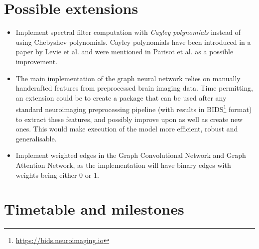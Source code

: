 \documentclass[12pt,a4paper,twoside]{article}
\begin{document}
\section*{Possible extensions}
\begin{itemize}
  \item Implement spectral filter computation with \textit{Cayley polynomials} instead of using Chebyshev polynomials. Cayley polynomials have been introduced in a paper by Levie et al. \cite{levie2017cayleynets} and were mentioned in Parisot et al. \cite{parisot2018disease} as a possible improvement.
  \item The main implementation of the graph neural network relies on manually handcrafted features from preprocessed brain imaging data. Time permitting, an extension could be to create a package that can be used after any standard neuroimaging preprocessing pipeline (with results in BIDS\footnote{\url{https://bids.neuroimaging.io}} format) to extract these features, and possibly improve upon as well as create new ones. This would make execution of the model more efficient, robust and generalisable.
  \item Implement weighted edges in the Graph Convolutional Network and Graph Attention Network, as the implementation will have binary edges with weights being either 0 or 1.

\end{itemize}


\section*{Timetable and milestones}
\label{section:timetable}


\end{document}
